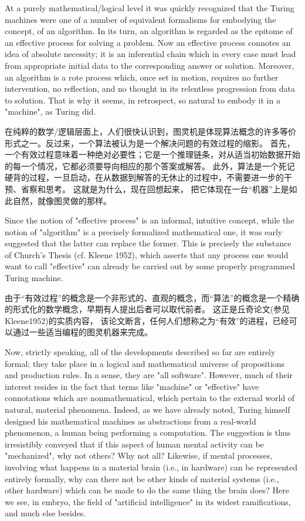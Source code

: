 \documentclass[a4paper,12pt]{article}
\begin{document}
At a purely mathematical/logical level it was quickly recognized that the Turing machines were one of a number of equivalent formalisms for
embodying the concept, of an algorithm. In its turn, an algorithm is regarded as the epitome of an effective process for solving a problem.
Now an effective process connotes an idea of absolute necessity; it is an inferential chain which in every case must lead from appropriate initial data to the
corresponding answer or solution. Moreover, an algorithm is a rote process which, once set in motion, requires no further intervention, no reflection,
and no thought in its relentless progression from data to solution. That is why it seems, in retrospect, so natural to embody it in a "machine", as Turing did.

在纯粹的数学/逻辑层面上，人们很快认识到，图灵机是体现算法概念的许多等价形式之一。反过来，一个算法被认为是一个解决问题的有效过程的缩影。
首先，一个有效过程意味着一种绝对必要性；它是一个推理链条，对从适当初始数据开始的每一个情况，它都必须要导向相应的那个答案或解答。
此外，算法是一个死记硬背的过程，一旦启动，在从数据到解答的无休止的过程中，不需要进一步的干预、省察和思考。 这就是为什么，现在回想起来，
把它体现在一台“机器”上是如此自然，就像图灵做的那样。

Since the notion of "effective process" is an informal, intuitive concept, while the notion of "algorithm" is a precisely formalized mathematical one,
it was early suggested that the latter can replace the former. This is precisely the substance of Church's Thesis (cf. Kleene 1952),
which asserts that any process one would want to call "effective" can already be carried out by some properly programmed Turing machine.

由于“有效过程”的概念是一个非形式的、直观的概念，而“算法”的概念是一个精确的形式化的数学概念，早期有人提出后者可以取代前者。
这正是丘奇论文(参见 Kleene1952)的实质内容， 该论文断言，任何人们想称之为“有效”的进程，已经可以通过一些适当编程的图灵机器来完成。

Now, strictly speaking, all of the developments described so far are entirely formal; they take place in a logical and mathematical universe of
propositions and production rules. In a sense, they are "all software". However, much of their interest resides in the fact that terms like "machine"
or "effective" have connotations which are nonmathematical, which pertain to the external world of natural, material phenomena.
Indeed, as we have already noted, Turing himself designed his mathematical machines as abstractions from a real-world phenomenon,
a human being performing a computation. The suggestion is thus irresistibly conveyed that if this aspect of human mental
activity can be "mechanized", why not others? Why not all? Likewise, if mental processes, involving what happens in a material
brain (i.e., in hardware) can be represented entirely formally, why can there not be other kinds of material systems (i.e., other hardware) which can be
made to do the same thing the brain does? Here we see, in embryo, the field of "artificial intelligence" in its widest ramifications, and much else besides.
\end{document}
